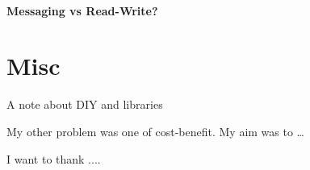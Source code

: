 \documentclass[english,submission]{programming}
\begin{document}
\hypertarget{messaging-vs-read-write}{%
\paragraph{Messaging vs Read-Write?}\label{messaging-vs-read-write}}

\hypertarget{misc}{%
\section{Misc}\label{misc}}

A note about DIY and libraries

My other problem was one of cost-benefit. My aim was to \ldots{}


\acks
I want to thank ....

\printbibliography
\end{document}
